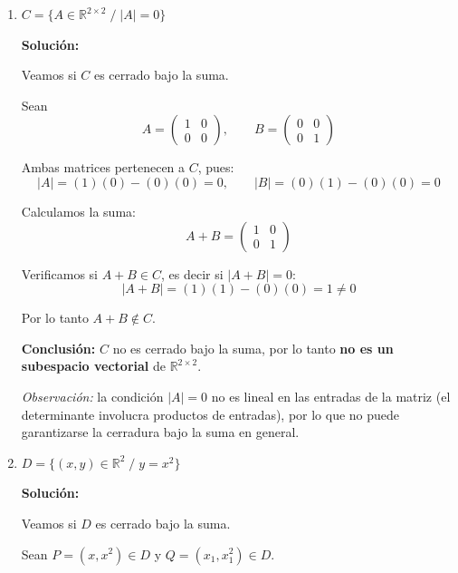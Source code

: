 \documentclass[12pt]{article}
\newcommand{\solucion}{%
    \vspace{0.8em}%
    \textbf{Solución:}%
    \vspace{0.8em}%
}
\begin{document}
\begin{enumerate}[label=\alph*.-]
    Para que $M_1+M_2 \in B$, la entrada $(1,2)$ debería ser $1$, pero:
    \[
    1+1 = 2 \neq 1
    \]

    Por lo tanto $M_1+M_2 \notin B$.

    \textbf{Conclusión:} $B$ no es cerrado bajo la suma, por lo tanto \textbf{no es un subespacio vectorial} de $\mathbb{R}^{2\times2}$.

    \item $C = \{A \in \mathbb{R}^{2\times2} \; / \; |A|=0\}$

    \solucion

    Veamos si $C$ es cerrado bajo la suma.

    Sean
    \[
    A=\begin{pmatrix}1 & 0\\ 0 & 0\end{pmatrix}, \qquad
    B=\begin{pmatrix}0 & 0\\ 0 & 1\end{pmatrix}
    \]

    Ambas matrices pertenecen a $C$, pues:
    \[
    |A| = (1)(0)-(0)(0) = 0, \qquad |B| = (0)(1)-(0)(0) = 0
    \]

    Calculamos la suma:
    \[
    A+B = \begin{pmatrix}1 & 0\\ 0 & 1\end{pmatrix}
    \]

    Verificamos si $A+B \in C$, es decir si $|A+B|=0$:
    \[
    |A+B| = (1)(1)-(0)(0) = 1 \neq 0
    \]

    Por lo tanto $A+B \notin C$.

    \textbf{Conclusión:} $C$ no es cerrado bajo la suma, por lo tanto \textbf{no es un subespacio vectorial} de $\mathbb{R}^{2\times2}$.

    \textit{Observación:} la condición $|A|=0$ no es lineal en las entradas de la matriz (el determinante involucra productos de entradas), por lo que no puede garantizarse la cerradura bajo la suma en general.

    \item $D = \{(x,y) \in \mathbb{R}^2 \; / \; y=x^2\}$

    \solucion

    Veamos si $D$ es cerrado bajo la suma.

    Sean $P=(x,x^2) \in D$ y $Q=(x_1,x_1^2) \in D$.


\end{enumerate}
\end{document}
